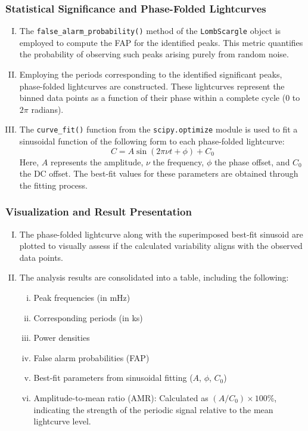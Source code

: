    		\subsubsection{Statistical Significance and Phase-Folded Lightcurves}
    			\begin{enumerate}[I.]
    				\item The \texttt{false\_alarm\_probability()} method of the \texttt{LombScargle} object is employed to compute the FAP for the identified peaks. This metric quantifies the probability of observing such peaks arising purely from random noise.
    				\item Employing the periods corresponding to the identified significant peaks, phase-folded lightcurves are constructed. These lightcurves represent the binned data points as a function of their phase within a complete cycle (0 to $2\pi$ radians).
    				\item The \texttt{curve\_fit()} function from the \texttt{scipy.optimize} module is used to fit a sinusoidal function of the following form to each phase-folded lightcurve:
    				$$C=A\sin(2\pi\nu t+\phi)+C_0$$
    				Here, $A$ represents the amplitude, $\nu$ the frequency, $\phi$ the phase offset, and $C_0$ the DC offset. The best-fit values for these parameters are obtained through the fitting process.
    			\end{enumerate}
    		
    		\subsubsection{Visualization and Result Presentation}
    			\begin{enumerate}[I.]
    				\item The phase-folded lightcurve along with the superimposed best-fit sinusoid are plotted to visually assess if the calculated variability aligns with the observed data points.
    				\item The analysis results are consolidated into a table, including the following:
    				\begin{enumerate}[i.]
    					\item Peak frequencies (in mHz)
    					\item Corresponding periods (in ks)
    					\item Power densities
    					\item False alarm probabilities (FAP)
    					\item Best-fit parameters from sinusoidal fitting ($A$, $\phi$, $C_0$)
    					\item Amplitude-to-mean ratio (AMR): Calculated as $(A/C_0)\times 100\%$, indicating the strength of the periodic signal relative to the mean lightcurve level.
    				\end{enumerate}
    			\end{enumerate}